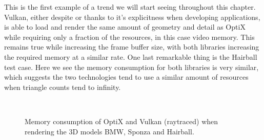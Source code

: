 This is the first example of a trend we will start seeing throughout this chapter. Vulkan, either despite or thanks to it's explicitness when developing applications, is able to load and render the same amount of geometry and detail as OptiX while requiring only a fraction of the resources, in this case video memory. This remains true while increasing the frame buffer size, with both libraries increasing the required memory at a similar rate. One last remarkable thing is the Hairball test case. Here we see the memory consumption for both libraries is very similar, which suggests the two technologies tend to use a similar amount of resources when triangle counts tend to infinity.

\begin{figure}
    \\
    \centering
    \caption{Memory consumption of OptiX and Vulkan (raytraced) when rendering the 3D models BMW, Sponza and Hairball.}
    \label{memory-usage-raytraced-comparison-graph}
\end{figure}

